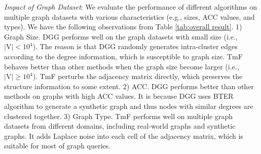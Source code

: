 \documentclass[conference]{IEEEtran}
\theoremstyle{plain}
\begin{document}
\textit{Impact of Graph Dataset}:
We evaluate the performance of different algorithms on multiple graph datasets with various characteristics (e.g., sizes, ACC values, and types).
We have the following observations from Table \ref{tab:overall result}.
1) Graph Size. 
DGG performs well on the graph datasets with small size (i.e., $|\text{V}|<10^4$).
The reason is that DGG randomly generates intra-cluster edges according to the degree information, which is susceptible to graph size.
TmF behaves better than other methods when the graph size become larger (i.e., $|\text{V}| \geq 10^4$).
TmF perturbs the adjacency matrix directly, which preserves the structure information to some extent.
2) ACC. 
DGG performs better than other methods on graphs with high ACC values.
It is because DGG uses BTER algorithm to generate a synthetic graph and thus nodes with similar degrees are clustered together.
3) Graph Type. 
TmF performs well on multiple graph datasets from different domains, including real-world graphs and synthetic graphs.
It adds Laplace noise into each cell of the adjacency matrix, which is suitable for most of graph queries.
\end{document}
